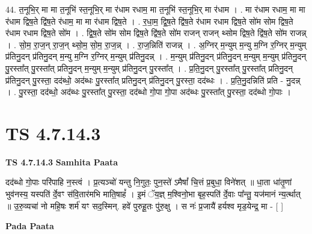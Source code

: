 \documentclass[17pt]{extarticle}
\begin{document}
44. त॒नूभि॒र् मा मा त॒नूभि॑ स्त॒नूभि॒र् मा र॑धाम रधाम॒ मा त॒नूभि॑ स्त॒नूभि॒र् मा र॑धाम । . मा र॑धाम रधाम॒ मा मा र॑धाम द्विष॒ते द्वि॑ष॒ते र॑धाम॒ मा मा र॑धाम द्विष॒ते । . र॒धा॒म॒ द्वि॒ष॒ते द्वि॑ष॒ते र॑धाम रधाम द्विष॒ते सो॑म सोम द्विष॒ते र॑धाम रधाम द्विष॒ते सो॑म । . द्वि॒ष॒ते सो॑म सोम द्विष॒ते द्वि॑ष॒ते सो॑म राजन् राजन् थ्सोम द्विष॒ते द्वि॑ष॒ते सो॑म राजन्न् । . सो॒म॒ रा॒ज॒न् रा॒ज॒न् थ्सो॒म॒ सो॒म॒ रा॒ज॒न्न् । . रा॒ज॒न्निति॑ राजन्न् । . अ॒ग्निर् म॒न्युम् म॒न्यु म॒ग्नि र॒ग्निर् म॒न्युम् प्र॑तिनु॒दन् प्र॑तिनु॒दन् म॒न्यु म॒ग्नि र॒ग्निर् म॒न्युम् प्र॑तिनु॒दन्न् । . म॒न्युम् प्र॑तिनु॒दन् प्र॑तिनु॒दन् म॒न्युम् म॒न्युम् प्र॑तिनु॒दन् पु॒रस्ता᳚त् पु॒रस्ता᳚त् प्रतिनु॒दन् म॒न्युम् म॒न्युम् प्र॑तिनु॒दन् पु॒रस्ता᳚त् । . प्र॒ति॒नु॒दन् पु॒रस्ता᳚त् पु॒रस्ता᳚त् प्रतिनु॒दन् प्र॑तिनु॒दन् पु॒रस्ता॒ दद॑ब्धो॒ अद॑ब्धः पु॒रस्ता᳚त् प्रतिनु॒दन् प्र॑तिनु॒दन् पु॒रस्ता॒ दद॑ब्धः । . प्र॒ति॒नु॒दन्निति॑ प्रति - नु॒दन्न् । . पु॒रस्ता॒ दद॑ब्धो॒ अद॑ब्धः पु॒रस्ता᳚त् पु॒रस्ता॒ दद॑ब्धो गो॒पा गो॒पा अद॑ब्धः पु॒रस्ता᳚त् पु॒रस्ता॒ दद॑ब्धो गो॒पाः । \newline
\pagebreak
{}

\section{ TS 4.7.14.3 }

\textbf{TS 4.7.14.3 } \newline
\textbf{Samhita Paata} \newline

दद॑ब्धो गो॒पाः परि॑पाहि न॒स्त्वं । प्र॒त्यञ्चो॑ यन्तु नि॒गुतः॒ पुन॒स्ते॑ ऽमैषां᳚ चि॒त्तं प्र॒बुधा॒ विने॑शत् ॥ धा॒ता धा॑तृ॒णां भुव॑नस्य॒ यस्पति॑ र्दे॒वꣳ स॑वि॒तार॑मभि माति॒षाहं᳚ । इ॒मं ॅय॒ज्ञ् म॒श्विनो॒भा बृह॒स्पति॑ र्दे॒वाः पा᳚न्तु॒ यज॑मानं न्य॒र्त्थात् ॥ उ॒रु॒व्यचा॑ नो महि॒षः शर्म॑ यꣳ सद॒स्मिन्. हवे॑ पुरुहू॒तः पु॑रु॒क्षु । स नः॑ प्र॒जायै॑ हर्यश्व मृड॒येन्द्र॒ मा - [  ] \newline

\textbf{Pada Paata} \newline
\end{document}
